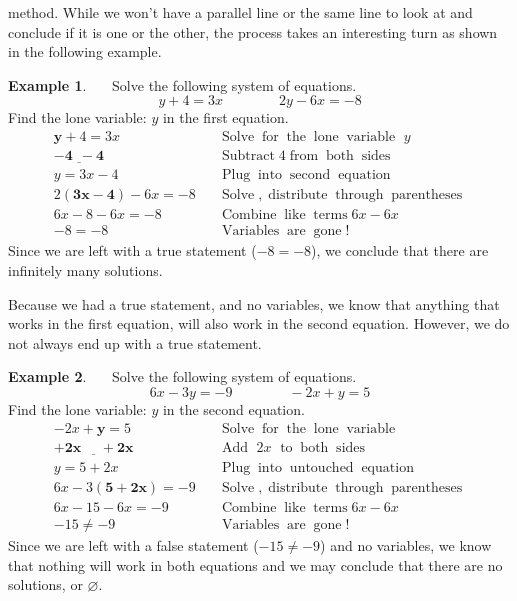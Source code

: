 \documentclass[12pt]{book}
\theoremstyle{definition}
\newtheorem{example}{Example}
\newcommand{\tmmathbf}[1]{\ensuremath{\boldsymbol{#1}}}
\newcommand{\tmop}[1]{\ensuremath{\operatorname{#1}}}
\begin{document}
method. While we won't have a parallel line or the same line to look at and conclude if it is one or the other, the process takes an interesting turn as
shown in the following example.
\begin{example}~~~Solve the following system of equations.
$$y + 4 = 3 x\qquad\qquad 2 y - 6 x = - 8$$
Find the lone variable: $y$ in the first equation.
  \begin{eqnarray*}
  	\tmmathbf{y} + 4 = 3 x~~~~~ &  & \tmop{Solve} \tmop{for} \tmop{the} \tmop{lone}
    \tmop{variable~} y\\
    \tmmathbf{\underline{- 4 ~~- 4}}~~~~ &  & \tmop{Subtract} 4 \tmop{from} \tmop{both} \tmop{sides} \\
		y = 3 x - 4 &  & \tmop{Plug} \tmop{into} \tmop{second}
    \tmop{equation}\\
	  2 \tmmathbf{(3 x - 4)} - 6 x = - 8 &  & \tmop{Solve}, \tmop{distribute}
    \tmop{through} \tmop{parentheses}\\
    6 x - 8 - 6 x = - 8 &  & \tmop{Combine} \tmop{like} \tmop{terms} 6 x - 6x\\
    - 8 = - 8 &  & \tmop{Variables} \tmop{are} \tmop{gone} !
  \end{eqnarray*}
Since we are left with a true statement ($-8=-8$), we conclude that there are infinitely many solutions.
\end{example}
Because we had a true statement, and no variables, we know that anything that works in the first equation, will also work in the second equation. However,
we do not always end up with a true statement.
\begin{example}~~~Solve the following system of equations.
      $$6 x - 3 y = - 9\qquad\qquad - 2 x + y = 5$$
Find the lone variable: $y$ in the second equation.
  \begin{eqnarray*}
    - 2 x + \tmmathbf{y} = 5~~~~~~~ &  & \tmop{Solve} \tmop{for} \tmop{the} \tmop{lone}
    \tmop{variable}\\
    \tmmathbf{\underline{+ 2 x ~~~~~~+ 2 x}}~~~ &  & \tmop{Add~} 2 x \tmop{~to} \tmop{both} \tmop{sides} \\
    y = 5 + 2 x &  & \tmop{Plug} \tmop{into} \tmop{untouched}
    \tmop{equation}\\
    6 x - 3 \tmmathbf{(5 + 2 x)} = - 9 &  & \tmop{Solve}, \tmop{distribute}
    \tmop{through} \tmop{parentheses}\\
    6 x - 15 - 6 x = - 9 &  & \tmop{Combine} \tmop{like} \tmop{terms} 6 x - 6
    x\\
    - 15 \neq - 9 &  & \tmop{Variables} \tmop{are} \tmop{gone}!
  \end{eqnarray*}
Since we are left with a false statement ($-15\neq -9$) and no variables, we know that nothing will work in both equations and we may conclude that there are no solutions, or $\varnothing$.
\end{example}
\end{document}
